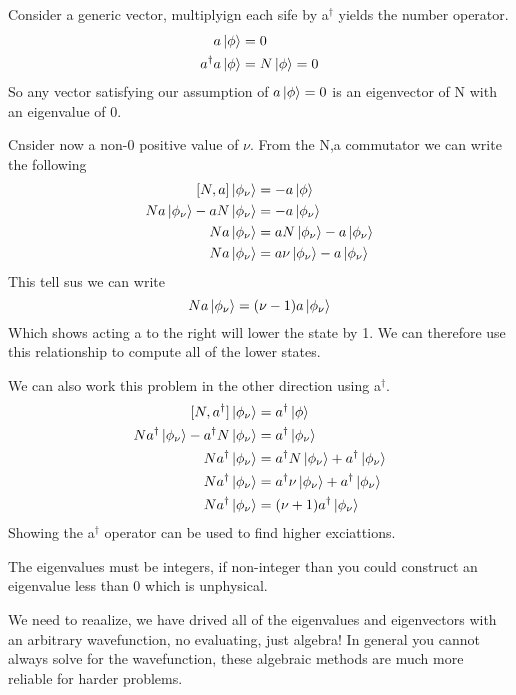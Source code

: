 \documentclass{article}
\newcommand{\be}{\begin{equation}}
\newcommand{\ee}{\end{equation}}
\newcommand{\dg}{\dagger}
\begin{document}
Consider a generic vector, multiplyign each sife by a$^\dg$ yields the number operator. 
\be
\begin{split}
    a\ket{\phi} &= 0 \\
    a^\dg a \ket{\phi} &= N\ket{\phi} = 0
\end{split}
\ee
So any vector satisfying our assumption of $a\ket{\phi} = 0$ is an eigenvector of N with an eigenvalue of 0. 

Cnsider now a non-0 positive value of $\nu$. 
From the N,a commutator we can write the following
\be
\begin{split}
    [N,a]\ket{\phi_\nu} &= -a\ket{\phi}\\
    Na\ket{\phi_\nu} - aN\ket{\phi_\nu} &= -a\ket{\phi_\nu}\\
    Na\ket{\phi_\nu} &= aN\ket{\phi_\nu} -a\ket{\phi_\nu}\\
    Na\ket{\phi_\nu} &= a\nu\ket{\phi_\nu} -a\ket{\phi_\nu}
\end{split}
\ee
This tell sus we can write 
\be
Na \ket{\phi_\nu} = (\nu-1)a\ket{\phi_\nu}
\ee
Which shows acting a to the right will lower the state by 1.
We can therefore use this relationship to compute all of the lower states. 

We can also work this problem in the other direction using a$^\dg$.
\be
\begin{split}
    [N,a^\dg]\ket{\phi_\nu} &= a^\dg\ket{\phi}\\
    Na^\dg\ket{\phi_\nu} - a^\dg N\ket{\phi_\nu} &= a^\dg\ket{\phi_\nu}\\
    Na^\dg\ket{\phi_\nu} &= a^\dg N\ket{\phi_\nu} + a^\dg\ket{\phi_\nu}\\
    Na^\dg\ket{\phi_\nu} &= a^\dg \nu\ket{\phi_\nu} + a^\dg\ket{\phi_\nu}\\
    Na^\dg \ket{\phi_\nu} &= (\nu+1)a^\dg\ket{\phi_\nu}
\end{split}
\ee
Showing the a$^\dg$ operator can be used to find higher exciattions. 

The eigenvalues must be integers, if non-integer than you could construct an eigenvalue less than 0 which is unphysical. 

We need to reaalize, we have drived all of the eigenvalues and eigenvectors with an arbitrary wavefunction, no evaluating, just algebra!
In general you cannot always solve for the wavefunction, these algebraic methods are much more reliable for harder problems. 
\end{document}

